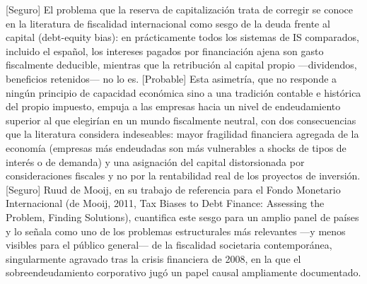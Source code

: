 \documentclass[10pt,a4paper]{article}
\begin{document}
[Seguro] El problema que la reserva de capitalización trata de corregir se conoce en la literatura de fiscalidad internacional como sesgo de la deuda frente al capital (debt-equity bias): en prácticamente todos los sistemas de IS comparados, incluido el español, los intereses pagados por financiación ajena son gasto fiscalmente deducible, mientras que la retribución al capital propio —dividendos, beneficios retenidos— no lo es. [Probable] Esta asimetría, que no responde a ningún principio de capacidad económica sino a una tradición contable e histórica del propio impuesto, empuja a las empresas hacia un nivel de endeudamiento superior al que elegirían en un mundo fiscalmente neutral, con dos consecuencias que la literatura considera indeseables: mayor fragilidad financiera agregada de la economía (empresas más endeudadas son más vulnerables a shocks de tipos de interés o de demanda) y una asignación del capital distorsionada por consideraciones fiscales y no por la rentabilidad real de los proyectos de inversión. [Seguro] Ruud de Mooij, en su trabajo de referencia para el Fondo Monetario Internacional (de Mooij, 2011, Tax Biases to Debt Finance: Assessing the Problem, Finding Solutions), cuantifica este sesgo para un amplio panel de países y lo señala como uno de los problemas estructurales más relevantes —y menos visibles para el público general— de la fiscalidad societaria contemporánea, singularmente agravado tras la crisis financiera de 2008, en la que el sobreendeudamiento corporativo jugó un papel causal ampliamente documentado.
\end{document}
